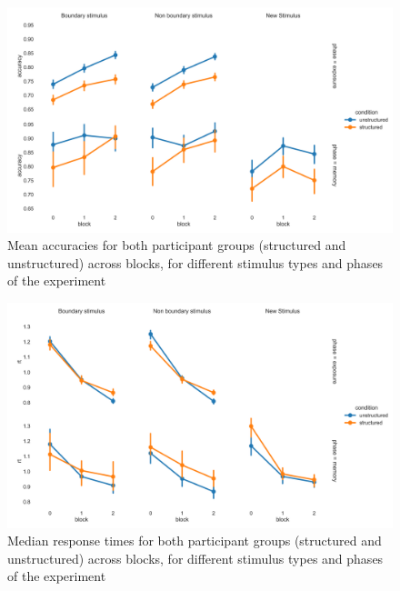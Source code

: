 \begin{figure}
    \centering
    \includegraphics[width = \textwidth]{chapter_notebooks/chapter_3/figures/exposure_recog_accuracy_allphases.png}
    \caption{Mean accuracies for both participant groups (structured and unstructured) across blocks, for different stimulus types and phases of the experiment}
    \label{fig:exp2-accuracies}
\end{figure}


\begin{figure}
    \centering
    \includegraphics[width = \textwidth]{chapter_notebooks/chapter_3/figures/exposure_recog_rt_allphases.png}
    \caption{Median response times for both participant groups (structured and unstructured) across blocks, for different stimulus types and phases of the experiment}
    \label{fig:exp2-rts}
\end{figure}

